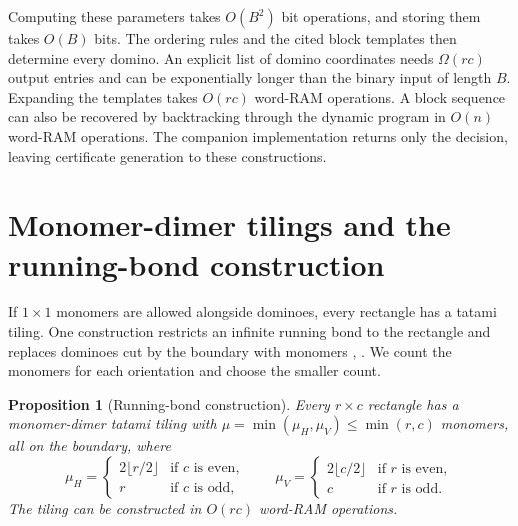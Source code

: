 \documentclass[11pt, reqno]{amsart}
\newtheorem{proposition}[theorem]{Proposition}
\theoremstyle{definition}
\theoremstyle{remark}
\numberwithin{equation}{section}
\begin{document}
Computing these parameters takes $O(B^2)$ bit operations, and storing
them takes $O(B)$ bits. The ordering rules and the cited block templates
\cite{hickerson,ruskey} then determine every domino. An explicit list of
domino coordinates needs $\Omega(rc)$ output entries and can be
exponentially longer than the binary input of length $B$. Expanding
the templates takes $O(rc)$ word-RAM operations. A block sequence can
also be recovered by backtracking through the dynamic program in $O(n)$
word-RAM operations. The companion implementation returns only the
decision, leaving certificate generation to these constructions.

\section{Monomer-dimer tilings and the running-bond construction}
\label{sec:running-bond}

If $1\times1$ monomers are allowed alongside dominoes, every rectangle
has a tatami tiling. One construction restricts an infinite running bond
to the rectangle and replaces dominoes cut by the boundary with monomers
\cite[Section~4]{ersw10}, \cite[Section~4.2]{erws11}.
We count the monomers for each orientation and choose the smaller count.

\begin{proposition}[Running-bond construction]
    \label{prop:fallback}
    Every $r\times c$ rectangle has a monomer-dimer tatami tiling with
    $\mu=\min(\mu_H,\mu_V)\le\min(r,c)$ monomers, all on the boundary,
    where
    \begin{equation}
        \label{eq:bondcounts}
        \mu_H=
        \begin{cases}
            2\lfloor r/2\rfloor & \text{if $c$ is even}, \\
            r                   & \text{if $c$ is odd},
        \end{cases}
        \qquad
        \mu_V=
        \begin{cases}
            2\lfloor c/2\rfloor & \text{if $r$ is even}, \\
            c                   & \text{if $r$ is odd}.
        \end{cases}
    \end{equation}
    The tiling can be constructed in $O(rc)$ word-RAM operations.
\end{proposition}
\end{document}
